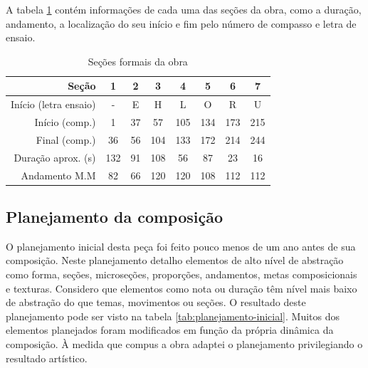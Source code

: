 A tabela \ref{tab:secoes-obra} contém informações de cada uma das
seções da obra, como a duração, andamento, a localização do seu início
e fim pelo número de compasso e letra de ensaio.

\begin{table}[!h]
  \centering
  \begin{tabular}{r|ccccccc}
    Seção & 1 & 2 & 3 & 4 & 5 & 6 & 7 \\
    \hline
    Início (letra ensaio) & - & E & H & L & O & R & U \\
    Início (comp.) & 1 & 37 & 57 & 105 & 134 & 173 & 215 \\
    Final (comp.) & 36 & 56 & 104 & 133 & 172 & 214 & 244 \\
    Duração aprox. (s) & 132 & 91 & 108 & 56 & 87 & 23 & 16\\
    Andamento M.M & 82 & 66 & 120 & 120 & 108 & 112 & 112 \\
  \end{tabular}
  \caption{Seções formais da obra}
  \label{tab:secoes-obra}
\end{table}

\subsection{Planejamento da composição}
\label{sec:plan-da-comp}

O planejamento inicial desta peça foi feito pouco menos de um ano
antes de sua composição. Neste planejamento detalho elementos de alto
nível de abstração como forma, seções, microseções, proporções,
andamentos, metas composicionais e texturas. Considero que elementos
como nota ou duração têm nível mais baixo de abstração do que temas,
movimentos ou seções. O resultado deste planejamento pode ser visto na
tabela \ref{tab:planejamento-inicial}. Muitos dos elementos planejados
foram modificados em função da própria dinâmica da composição. À
medida que compus a obra adaptei o planejamento privilegiando o
resultado artístico.

